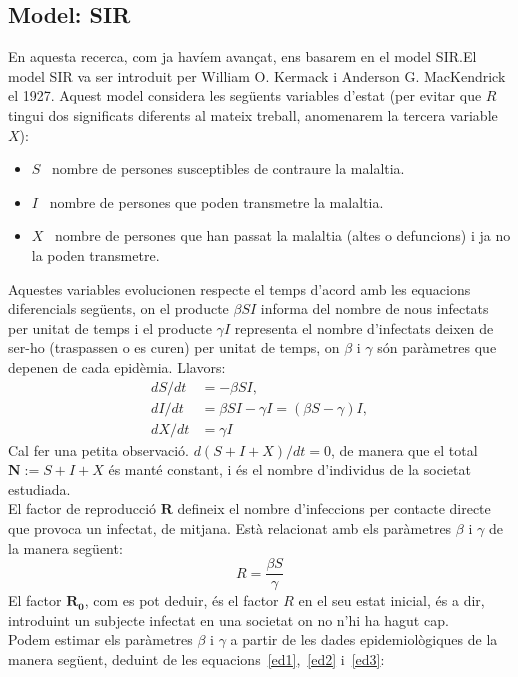 \documentclass[a4paper, 11pt]{article}
\begin{document}
  \subsection{Model: SIR}
  En aquesta recerca, com ja havíem avançat, ens basarem en el model SIR.\@ El model SIR\cite{sir, mora} va ser introduit per William O. Kermack i Anderson G. MacKendrick el 1927. Aquest model considera les següents variables d'estat (per evitar que $R$ tingui dos significats diferents al mateix treball, anomenarem la tercera variable $X$):
  \begin{itemize}
    \item[] $S$ \ nombre de persones susceptibles de contraure la malaltia.
    \item[] $I$ \ nombre de persones que poden transmetre la malaltia.
    \item[] $X$ \ nombre de persones que han passat la malaltia (altes o defuncions) i ja no la poden transmetre.
  \end{itemize}
  Aquestes variables evolucionen respecte el temps d'acord amb les equacions diferencials següents, on el producte $\beta S I$ informa del nombre de nous infectats per unitat de temps i el producte $\gamma I$ representa el nombre d'infectats deixen de ser-ho (traspassen o es curen) per unitat de temps, on $\beta$ i $\gamma$ són paràmetres que depenen de cada epidèmia. Llavors:
  \begin{align}
    \label{ed1} dS/dt &= - \beta S I ,\\
    \label{ed2} dI/dt &= \beta S I - \gamma I = (\beta S - \gamma) I,\\
    \label{ed3} dX/dt &= \gamma I
  \end{align}
  Cal fer una petita observació. $d(S+I+X)/dt = 0$, de manera que el total $\mathbf{N} := S + I + X$ és manté constant, i és el nombre d'individus de la societat estudiada.\\
  El factor de reproducció $\mathbf{R}$ defineix el nombre d'infeccions per contacte directe que provoca un infectat, de mitjana. Està relacionat amb els paràmetres $\beta$ i $\gamma$ de la manera següent:~\cite{mora}
  \begin{equation}
    R = \frac{\beta S}{\gamma}
  \end{equation}
  El factor $\mathbf{R_{0}}$, com es pot deduir, és el factor $R$ en el seu estat inicial, és a dir, introduint un subjecte infectat en una societat on no n'hi ha hagut cap.\\
  Podem estimar els paràmetres $\beta$ i $\gamma$ a partir de les dades epidemiològiques de la manera següent, deduint de les equacions~\ref{ed1},~\ref{ed2} i~\ref{ed3}:
\end{document}
